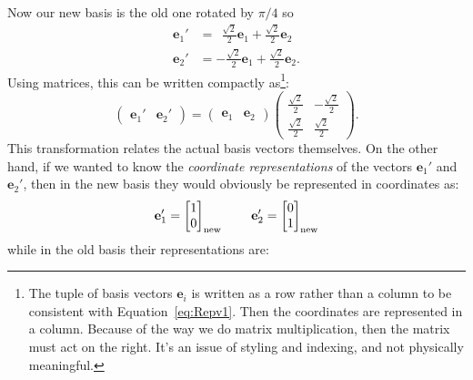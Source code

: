\documentclass[../master.tex]{subfiles}
\begin{document}
	Now our new basis is the old one rotated by $\pi/4$ so 
	\begin{align*}
		\mathbf e_1' &= ~~ \frac{\sqrt 2}{2} \mathbf e_1 + \frac{\sqrt 2}{2} \mathbf e_2\\
		\mathbf e_2' &= - \frac{\sqrt 2}{2}\mathbf e_1 + \frac{\sqrt 2}{2}\mathbf e_2.
	\end{align*}
	Using matrices, this can be written compactly as\footnote{The tuple of basis vectors $\mathbf e_i$ is written as a row rather than a column to be consistent with Equation~\eqref{eq:Repv1}. Then the coordinates are represented in a column. Because of the way we do matrix multiplication, then the matrix must act on the right. It's an issue of styling and indexing, and not physically meaningful. %
	}:
	\begin{equation*}
		\begin{pmatrix}
			\mathbf e_1' & \mathbf e_2'
		\end{pmatrix}
		= 
		\begin{pmatrix}
			\mathbf e_1 & \mathbf e_2
		\end{pmatrix}
		\begin{pmatrix}
					 \frac{\sqrt 2}{2} &  -\frac{\sqrt 2}{2} \\
					 \frac{\sqrt 2}{2} &  \frac{\sqrt 2}{2}
		\end{pmatrix}.
	\end{equation*}
	This transformation relates the actual basis vectors themselves. On the other hand, if we wanted to know the \emph{coordinate representations} of the vectors $\mathbf e_1'$ and $\mathbf e_2'$, then in the new basis they would obviously be represented in coordinates as: 
	\begin{equation*}
		\mathbf e_1' = \begin{bmatrix}
			1 \\ 0
		\end{bmatrix}_{\mathrm{new}} \hspace{0.3in}
		\mathbf e_2' = \begin{bmatrix}
			0 \\ 1
		\end{bmatrix}_{\mathrm{new}}
	\end{equation*}
	while in the old basis their representations are:
	
\end{document}

